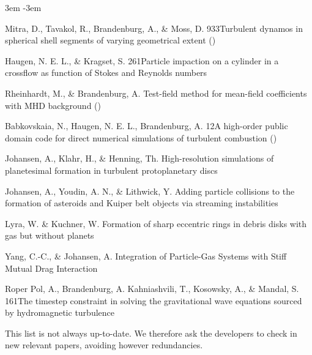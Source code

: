 \documentclass[\mydriver,12pt,twoside,notitlepage,a4paper]{article}
\begin{document}
\begin{list}{}{\leftmargin 3em \itemindent -3em\listparindent \itemindent
\itemsep 0pt \parsep 1pt}
\item
Mitra, D., Tavakol, R., Brandenburg, A., \& Moss, D.
{933}{Turbulent dynamos in spherical shell segments of varying geometrical extent} ()

\item
Haugen, N. E. L., \& Kragset, S.
{261}{Particle impaction on a cylinder in a crossflow as function of Stokes and Reynolds numbers}

\item
Rheinhardt, M., \& Brandenburg, A.
{Test-field method for mean-field coefficients with MHD background}
()

\item
Babkovskaia, N., Haugen, N. E. L., Brandenburg, A.
{12}{A high-order public domain code for direct numerical simulations of turbulent combustion}
()

\item
Johansen, A., Klahr, H., \& Henning, Th.
{High-resolution simulations of planetesimal formation in turbulent protoplanetary discs}

\item
Johansen, A., Youdin, A. N., \& Lithwick, Y.
{Adding particle collisions to the formation of asteroids and Kuiper belt objects via streaming instabilities}

\item
Lyra, W. \& Kuchner, W. 
{Formation of sharp eccentric rings in debris disks with gas but without planets}

\item
Yang, C.-C., \& Johansen, A.
{Integration of Particle-Gas Systems with Stiff Mutual Drag Interaction}

\item
Roper Pol, A., Brandenburg, A. Kahniashvili, T., Kosowsky, A., \& Mandal, S.
{161}{The timestep constraint in solving the gravitational wave equations sourced by hydromagnetic turbulence}

\end{list}
This list is not always up-to-date.
We therefore ask the developers to check in new relevant papers,
avoiding however redundancies.
\end{document}
